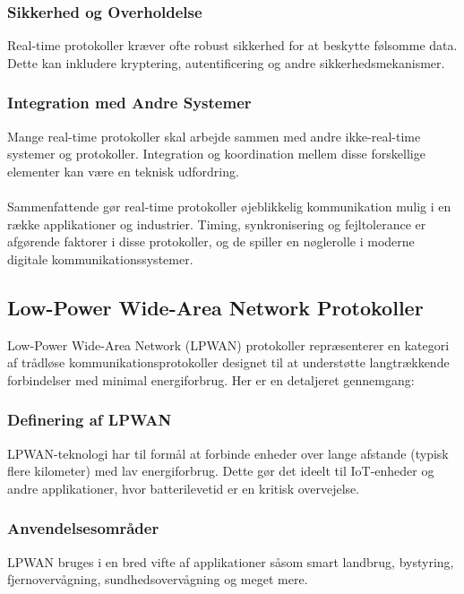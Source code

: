 \subsubsection{Sikkerhed og Overholdelse}
Real-time protokoller kræver ofte robust sikkerhed for at beskytte følsomme data. Dette kan inkludere kryptering, autentificering og andre sikkerhedsmekanismer.
\subsubsection{Integration med Andre Systemer}
Mange real-time protokoller skal arbejde sammen med andre ikke-real-time systemer og protokoller. Integration og koordination mellem disse forskellige elementer kan være en teknisk udfordring.
\\
\\
Sammenfattende gør real-time protokoller øjeblikkelig kommunikation mulig i en række applikationer og industrier. Timing, synkronisering og fejltolerance er afgørende faktorer i disse protokoller, og de spiller en nøglerolle i moderne digitale kommunikationssystemer.
\subsection{Low-Power Wide-Area Network Protokoller}
Low-Power Wide-Area Network (LPWAN) protokoller repræsenterer en kategori af trådløse kommunikationsprotokoller designet til at understøtte langtrækkende forbindelser med minimal energiforbrug. Her er en detaljeret gennemgang:
\subsubsection{Definering af LPWAN}	
LPWAN-teknologi har til formål at forbinde enheder over lange afstande (typisk flere kilometer) med lav energiforbrug. Dette gør det ideelt til IoT-enheder og andre applikationer, hvor batterilevetid er en kritisk overvejelse.
\subsubsection{Anvendelsesområder}
LPWAN bruges i en bred vifte af applikationer såsom smart landbrug, bystyring, fjernovervågning, sundhedsovervågning og meget mere.
